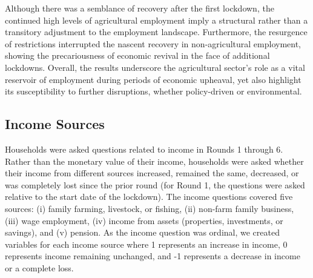 \documentclass{wber}
\begin{document}
Although there was a semblance of recovery after the first lockdown, the
continued high levels of agricultural employment imply a structural
rather than a transitory adjustment to the employment landscape.
Furthermore, the resurgence of restrictions interrupted the nascent
recovery in non-agricultural employment, showing the precariousness of
economic revival in the face of additional lockdowns. Overall, the
results underscore the agricultural sector's role as a vital reservoir
of employment during periods of economic upheaval, yet also highlight
its susceptibility to further disruptions, whether policy-driven or
environmental.

\subsection{Income Sources}\label{income-sources}

Households were asked questions related to income in Rounds 1 through 6.
Rather than the monetary value of their income, households were asked
whether their income from different sources increased, remained the
same, decreased, or was completely lost since the prior round (for Round
1, the questions were asked relative to the start date of the lockdown).
The income questions covered five sources: (i) family farming,
livestock, or fishing, (ii) non-farm family business, (iii) wage
employment, (iv) income from assets (properties, investments, or
savings), and (v) pension. As the income question was ordinal, we
created variables for each income source where 1 represents an increase
in income, 0 represents income remaining unchanged, and -1 represents a
decrease in income or a complete loss.
\end{document}
